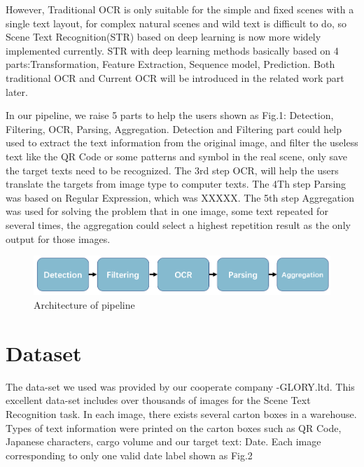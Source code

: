 \documentclass{article}
\begin{document}
However, Traditional OCR is only suitable for the simple and fixed scenes with a single text layout, for complex natural scenes and wild text is difficult to do, so Scene Text Recognition(STR) based on deep learning is now more widely implemented currently.
STR with deep learning methods basically based on 4 parts:Transformation, Feature Extraction, Sequence model, Prediction. Both traditional OCR and Current OCR will be introduced in the related work part later.\par
In our pipeline, we raise 5 parts to help the users shown as Fig.1: Detection, Filtering, OCR, Parsing, Aggregation. Detection and Filtering part could help used to extract the text information from the original image, and filter the useless text like the QR Code or some patterns and symbol in the real scene, only save the target texts need to be recognized. The 3rd step OCR, will help the users translate the targets from image type to computer texts. The 4Th step Parsing was based on Regular Expression, which was XXXXX. The 5th step Aggregation was used for solving the problem that in one image, some text repeated for several times, the aggregation could select a highest repetition result as the only output for those images.

\begin{figure}[ht] \centering    
	\label{architecture}     
	\includegraphics[width=0.8\columnwidth]{archi.png}  
   
	\caption{Architecture of pipeline}
\end{figure}

\section{Dataset}

The data-set we used was provided by our cooperate company -GLORY.ltd. This excellent data-set includes over thousands of images for the Scene Text Recognition task. In each image, there exists several carton boxes in a warehouse. Types of text information were printed on the carton boxes such as QR Code, Japanese characters, cargo volume and our target text: Date. Each image corresponding to only one valid date label shown as Fig.2
\end{document}
